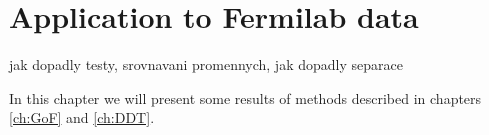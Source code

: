 \chapter{Application to Fermilab data}
jak dopadly testy, srovnavani promennych, jak dopadly separace

\noindent In this chapter we will present some results of methods described in chapters \ref{ch:GoF} and \ref{ch:DDT}. 